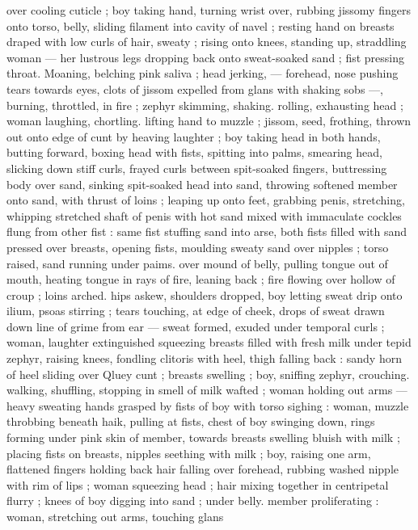 over cooling cuticle ; boy taking hand, turning wrist over, rubbing 
jissomy fingers onto torso, belly, sliding filament into cavity of navel 
; resting hand on breasts draped with low curls of hair, sweaty ; rising 
onto knees, standing up, straddling woman --- her lustrous legs 
dropping back onto sweat-soaked sand ; fist pressing throat. 
Moaning, belching pink saliva ; head jerking, --- forehead, nose 
pushing tears towards eyes, clots of jissom expelled from glans with 
shaking sobs ---, burning, throttled, in fire ; zephyr skimming, 
shaking. rolling, exhausting head ; woman laughing, chortling. lifting 
hand to muzzle ; jissom, seed, frothing, thrown out onto edge of cunt 
by heaving laughter ; boy taking head in both hands, butting forward, 
boxing head with fists, spitting into palms, smearing head, slicking 
down stiff curls, frayed curls between spit-soaked fingers, 
buttressing body over sand, sinking spit-soaked head into sand, 
throwing softened member onto sand, with thrust of loins ; leaping 
up onto feet, grabbing penis, stretching, whipping stretched shaft of 
penis with hot sand mixed with immaculate cockles flung from other 
fist : same fist stuffing sand into arse, both fists filled with sand 
pressed over breasts, opening fists, moulding sweaty sand over 
nipples ; torso raised, sand running under paims. over mound of 
belly, pulling tongue out of mouth, heating tongue in rays of fire, 
leaning back ; fire flowing over hollow of croup ; loins arched. hips 
askew, shoulders dropped, boy letting sweat drip onto ilium, psoas 
stirring ; tears touching, at edge of cheek, drops of sweat drawn 
down line of grime from ear --- sweat formed, exuded under 
temporal curls ; woman, laughter extinguished squeezing breasts 
filled with fresh milk under tepid zephyr, raising knees, fondling 
clitoris with heel, thigh falling back : sandy horn of heel sliding over 
Qluey cunt ; breasts swelling ; boy, sniffing zephyr, crouching. 
walking, shuffling, stopping in smell of milk wafted ; woman holding 
out arms --- heavy sweating hands grasped by fists of boy with torso 
sighing : woman, muzzle throbbing beneath haik, pulling at fists, 
chest of boy swinging down, rings forming under pink skin of 
member, towards breasts swelling bluish with milk ; placing fists on 
breasts, nipples seething with milk ; boy, raising one arm, flattened 
fingers holding back hair falling over forehead, rubbing washed 
nipple with rim of lips ; woman squeezing head ; hair mixing together 
in centripetal flurry ; knees of boy digging into sand ; under belly. 
member proliferating : woman, stretching out arms, touching glans 
